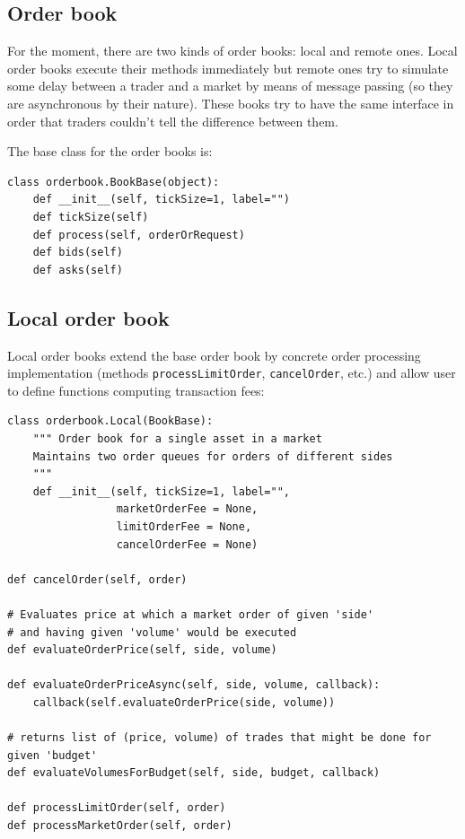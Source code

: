 \documentclass[a4paper,11pt]{article}
\begin{document}
\subsection{Order book}\label{order-book}

For the moment, there are two kinds of order books: local and remote
ones. Local order books execute their methods immediately but remote
ones try to simulate some delay between a trader and a market by means
of message passing (so they are asynchronous by their nature). These
books try to have the same interface in order that traders couldn't tell
the difference between them.

The base class for the order books is:

\begin{verbatim}
class orderbook.BookBase(object):
    def __init__(self, tickSize=1, label="")
    def tickSize(self)
    def process(self, orderOrRequest)
    def bids(self)
    def asks(self)
\end{verbatim}

\subsection{Local order book}\label{local-order-book}

Local order books extend the base order book by concrete order
processing implementation (methods \texttt{processLimitOrder},
\texttt{cancelOrder}, etc.) and allow user to define functions computing
transaction fees:

\begin{verbatim}
class orderbook.Local(BookBase):
    """ Order book for a single asset in a market
    Maintains two order queues for orders of different sides
    """
    def __init__(self, tickSize=1, label="",
                 marketOrderFee = None,
                 limitOrderFee = None,
                 cancelOrderFee = None)

def cancelOrder(self, order)

# Evaluates price at which a market order of given 'side' 
# and having given 'volume' would be executed
def evaluateOrderPrice(self, side, volume)

def evaluateOrderPriceAsync(self, side, volume, callback):
    callback(self.evaluateOrderPrice(side, volume))

# returns list of (price, volume) of trades that might be done for given 'budget'
def evaluateVolumesForBudget(self, side, budget, callback)

def processLimitOrder(self, order)
def processMarketOrder(self, order)
\end{verbatim}
\end{document}
